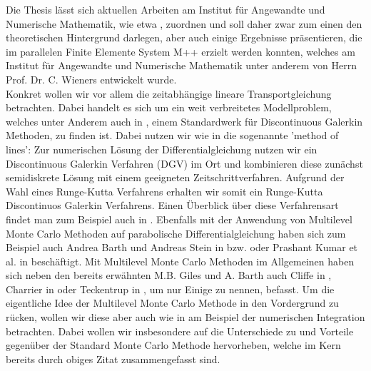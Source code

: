 Die Thesis lässt sich aktuellen Arbeiten am Institut für Angewandte und Numerische Mathematik, wie etwa \cite{bibid}, zuordnen und soll daher zwar zum einen den theoretischen Hintergrund darlegen, aber auch einige Ergebnisse präsentieren, die im parallelen Finite Elemente System M++ \cite{siteM++} erzielt werden konnten, welches am Institut für Angewandte und Numerische Mathematik unter anderem von Herrn Prof. Dr. C. Wieners entwickelt wurde. \\
Konkret wollen wir vor allem die zeitabhängige lineare Transportgleichung betrachten. Dabei handelt es sich um ein weit verbreitetes Modellproblem, welches unter Anderem auch in \cite{di2011mathematical}, einem Standardwerk für Discontinuous Galerkin Methoden, zu finden ist. 
Dabei nutzen wir wie in \cite{di2011mathematical} die sogenannte 'method of lines': Zur numerischen Lösung der Differentialgleichung nutzen wir ein Discontinuous Galerkin Verfahren (DGV) im Ort und kombinieren diese zunächst semidiskrete Lösung mit einem geeigneten Zeitschrittverfahren. Aufgrund der Wahl eines Runge-Kutta Verfahrens erhalten wir somit ein Runge-Kutta Discontinuos Galerkin Verfahrens. Einen Überblick über diese Verfahrensart findet man zum Beispiel auch in \cite{cockburn2001runge}.
Ebenfalls mit der Anwendung von Multilevel Monte Carlo Methoden auf parabolische Differentialgleichung haben sich zum Beispiel auch Andrea Barth und Andreas Stein in \cite{barth2013multilevel} bzw. \cite{barth2019multilevel} oder Prashant Kumar et al. in \cite{kumar2018multigrid} beschäftigt. Mit Multilevel Monte Carlo Methoden im Allgemeinen haben sich neben den bereits erwähnten M.B. Giles und A. Barth auch Cliffe in \cite{cliffe2011multilevel}, Charrier in \cite{charrier2012strong} oder Teckentrup in \cite{teckentrup2013further}, um nur Einige zu nennen, befasst.
Um die eigentliche Idee der Multilevel Monte Carlo Methode in den Vordergrund zu rücken, wollen wir diese aber auch wie in \cite{heinrich2001multilevel} am Beispiel der numerischen Integration betrachten.
Dabei wollen wir insbesondere auf die Unterschiede zu und Vorteile gegenüber der Standard Monte Carlo Methode hervorheben, welche im Kern bereits durch obiges Zitat zusammengefasst sind.

